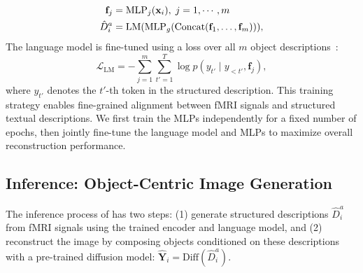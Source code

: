 \vspace{-0.2cm}
\vspace{-0.3cm}
\begin{equation}
\label{eq:d_object}
\begin{split}
\mathbf{f}_j &= \text{MLP}_j(\mathbf{x}_{i}), \; j= 1, \cdots, m\\
    \hat{D}_i^a &= \text{LM}(\text{MLP}_g(\text{Concat}(\mathbf{f}_1, \dots, \mathbf{f}_m))),
\end{split}
\vspace{-0.2cm}
\end{equation}
The language model is fine-tuned using a loss over all $m$ object descriptions~\citep{chang2024survey, gunel2020supervised}:
\vspace{-0.4cm}
\begin{equation}
\mathcal{L}_{\text{LM}} = - \sum_{j=1}^m \sum_{t'=1}^{T} \log p(y_{t'} \mid y_{<t'}, \mathbf{f}_j),
\end{equation}
where $ y_{t'}$ denotes the $t'$-th token in the structured description. This training strategy enables fine-grained alignment between fMRI signals and structured textual descriptions. We first train the MLPs independently for a fixed number of epochs, then jointly fine-tune the language model and MLPs to maximize overall reconstruction performance.



\subsection{\prism Inference: Object-Centric Image Generation}
\label{sec:inference}
The inference process of \prism has two steps: (1) generate structured descriptions $\hat{D}_i^a$ from fMRI signals using the trained encoder and language model, and (2) reconstruct the image by composing objects conditioned on these descriptions with a pre-trained diffusion model: $\hat{\mathbf{Y}}_i =\text{Diff}(\hat{D}_i^a)$. 


